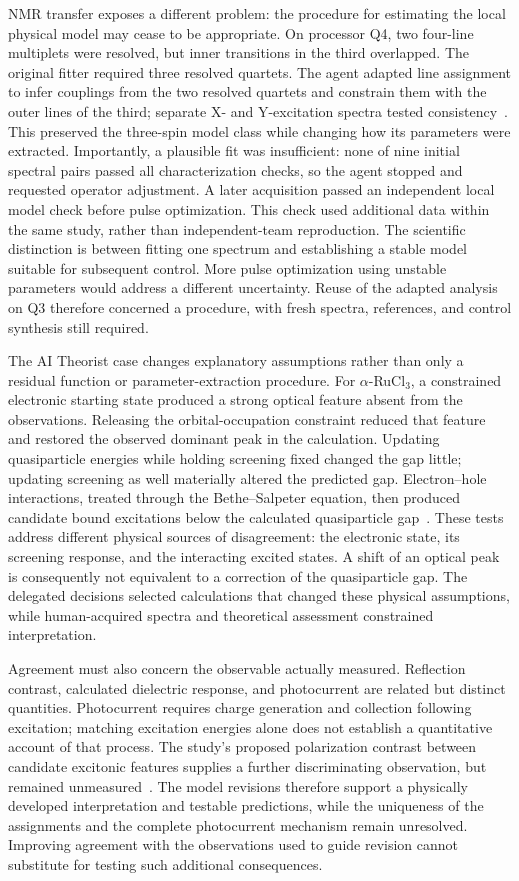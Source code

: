 NMR transfer exposes a different problem: the procedure for estimating the local physical model may cease to be appropriate. On processor Q4, two four-line multiplets were resolved, but inner transitions in the third overlapped. The original fitter required three resolved quartets. The agent adapted line assignment to infer couplings from the two resolved quartets and constrain them with the outer lines of the third; separate X- and Y-excitation spectra tested consistency~\cite{asd1064}. This preserved the three-spin model class while changing how its parameters were extracted. Importantly, a plausible fit was insufficient: none of nine initial spectral pairs passed all characterization checks, so the agent stopped and requested operator adjustment. A later acquisition passed an independent local model check before pulse optimization. This check used additional data within the same study, rather than independent-team reproduction. The scientific distinction is between fitting one spectrum and establishing a stable model suitable for subsequent control. More pulse optimization using unstable parameters would address a different uncertainty. Reuse of the adapted analysis on Q3 therefore concerned a procedure, with fresh spectra, references, and control synthesis still required.

The AI Theorist case changes explanatory assumptions rather than only a residual function or parameter-extraction procedure. For $\alpha$-RuCl$_3$, a constrained electronic starting state produced a strong optical feature absent from the observations. Releasing the orbital-occupation constraint reduced that feature and restored the observed dominant peak in the calculation. Updating quasiparticle energies while holding screening fixed changed the gap little; updating screening as well materially altered the predicted gap. Electron--hole interactions, treated through the Bethe--Salpeter equation, then produced candidate bound excitations below the calculated quasiparticle gap~\cite{asd1081}. These tests address different physical sources of disagreement: the electronic state, its screening response, and the interacting excited states. A shift of an optical peak is consequently not equivalent to a correction of the quasiparticle gap. The delegated decisions selected calculations that changed these physical assumptions, while human-acquired spectra and theoretical assessment constrained interpretation.

Agreement must also concern the observable actually measured. Reflection contrast, calculated dielectric response, and photocurrent are related but distinct quantities. Photocurrent requires charge generation and collection following excitation; matching excitation energies alone does not establish a quantitative account of that process. The study's proposed polarization contrast between candidate excitonic features supplies a further discriminating observation, but remained unmeasured~\cite{asd1081}. The model revisions therefore support a physically developed interpretation and testable predictions, while the uniqueness of the assignments and the complete photocurrent mechanism remain unresolved. Improving agreement with the observations used to guide revision cannot substitute for testing such additional consequences.

